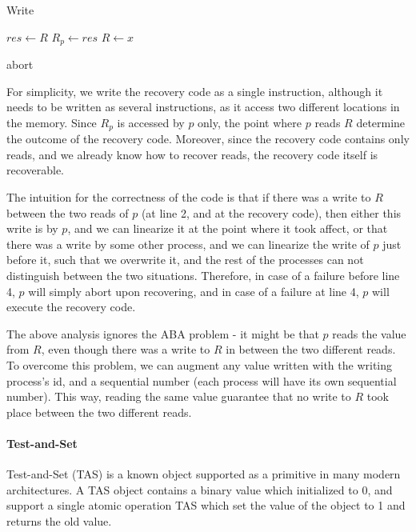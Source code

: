 \documentclass{article}
\begin{document}
\begin{algorithm}
	\caption{Write}\label{euclid}
	\begin{algorithmic}[1]
		\State $res \gets R$
		\State $R_{p} \gets res$
		\State $R \gets x$
		\EndProcedure
		
		 \Return abort
		\EndIf
		\EndProcedure
	\end{algorithmic}
\end{algorithm}

For simplicity, we write the recovery code as a single instruction, although it needs to be written as several instructions, as it access two different locations in the memory. Since $R_p$ is accessed by $p$ only, the point where $p$ reads $R$ determine the outcome of the recovery code. Moreover, since the recovery code contains only reads, and we already know how to recover reads, the recovery code itself is recoverable.

The intuition for the correctness of the code is that if there was a write to $R$ between the two reads of $p$ (at line 2, and at the recovery code), then either this write is by $p$, and we can linearize it at the point where it took affect, or that there was a write by some other process, and we can linearize the write of $p$ just before it, such that we overwrite it, and the rest of the processes can not distinguish between the two situations. Therefore, in case of a failure before line 4, $p$ will simply abort upon recovering, and in case of a failure at line 4, $p$ will execute the recovery code.

The above analysis ignores the ABA problem - it might be that $p$ reads the value from $R$, even though there was a write to $R$ in between the two different reads. To overcome this problem, we can augment any value written with the writing process's id, and a sequential number (each process will have its own sequential number). This way, reading the same value guarantee that no write to $R$ took place between the two different reads.


\paragraph*{Test-and-Set}

Test-and-Set (TAS) is a known object supported as a primitive in many modern architectures. A TAS object contains a binary value which initialized to 0, and support a single atomic operation TAS which set the value of the object to 1 and returns the old value.
\end{document}
